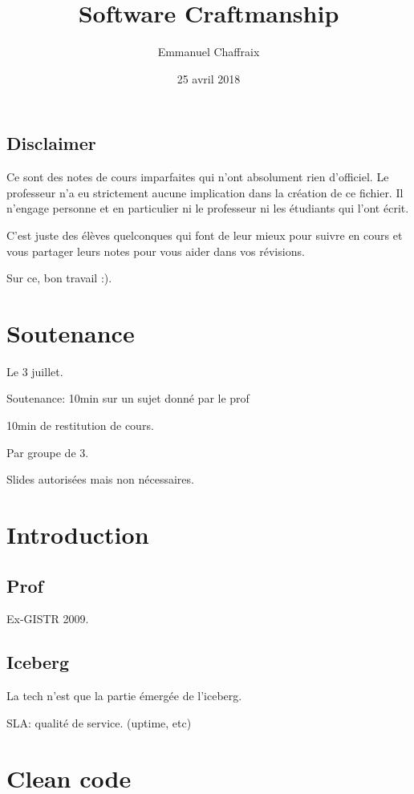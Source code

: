 \documentclass[a4paper,11pt]{article}
\title{Software Craftmanship}
\author{Emmanuel Chaffraix}
\date{25 avril 2018}
\begin{document}
\maketitle

\subsection*{Disclaimer}

Ce sont des notes de cours imparfaites qui n'ont absolument rien d'officiel.
Le professeur n'a eu strictement aucune implication dans la création de ce
fichier. Il n'engage personne et en particulier ni le professeur ni les
étudiants qui l'ont écrit.

C'est juste des élèves quelconques qui font de leur mieux pour suivre en cours
et vous partager leurs notes pour vous aider dans vos révisions.

Sur ce, bon travail :).

\tableofcontents

\newpage

\section{Soutenance}

Le 3 juillet.

Soutenance: 10min sur un sujet donné par le prof

10min de restitution de cours.

Par groupe de 3.

Slides autorisées mais non nécessaires.

\section{Introduction}

\subsection{Prof}

Ex-GISTR 2009.

\subsection{Iceberg}

La tech n'est que la partie émergée de l'iceberg.

SLA: qualité de service. (uptime, etc)

\section{Clean code}
\end{document}
